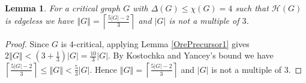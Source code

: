 \documentclass[12pt]{article}
\theoremstyle{plain}
\newtheorem{lem}[thm]{Lemma}
\theoremstyle{definition}
\theoremstyle{remark}
\newcommand{\fancy}[1]{\mathcal{#1}}
\renewcommand{\L}{\fancy{L}}
\newcommand{\HH}{\fancy{H}}
\newcommand{\card}[1]{\left|#1\right|}
\newcommand{\size}[1]{\left\Vert#1\right\Vert}
\newcommand{\ceil}[1]{\left\lceil#1\right\rceil}
\newcommand{\parens}[1]{\left( #1 \right)}
\newcommand{\mic}{\operatorname{mic}}
\begin{document}
\begin{lem}\label{EdgesIn4Critical}
For a critical graph $G$ with $\Delta(G) \leq \chi(G) = 4$ such that $\HH(G)$ is edgeless we have $\size{G} = \ceil{\frac{5\card{G} - 2}{3}}$ and $\card{G}$ is not a multiple of $3$.
\end{lem}
\begin{proof}
Since $G$ is $4$-critical, applying Lemma \ref{OrePrecursor1} gives $2\size{G} < \parens{3 + \frac13}\card{G} = \frac{10}{3}\card{G}$.  By Kostochka and Yancey's bound we have $\ceil{\frac{5\card{G}-2}{3}} \leq \size{G} < \frac{5}{3}\card{G}$.  Hence $\size{G} = \ceil{\frac{5\card{G} - 2}{3}}$ and $\card{G}$ is not a multiple of $3$.
\end{proof}
%
%
%
\end{document}
